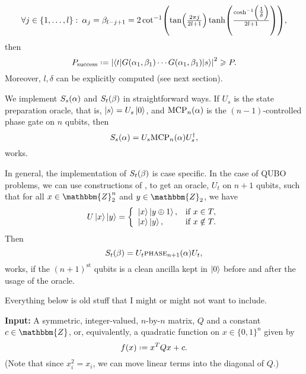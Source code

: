 \documentclass[reqno,oneside,12pt]{amsart}  %
\numberwithin{equation}{section}                %
\let\originalleft\left
\let\originalright\right
\renewcommand{\left}{\mathopen{}\mathclose\bgroup\originalleft}
\renewcommand{\right}{\aftergroup\egroup\originalright}
\def\({\mathopen{}\left(}
\def\){\right)\mathclose{}}
\newcommand*{\eqdef}{\mathrel{\vcenter{\baselineskip0.5ex \lineskiplimit0pt\hbox{.}\hbox{.}}}=}
\def\Z{\mathbbm{Z}}
\begin{document}
\begin{equation}
   \forall j \in \{ 1, \ldots, l \}: \: \alpha_j = \beta_{l - j + 1} = 2 \cot^{- 1} \( \tan \( \tfrac{2 \pi j}{2 l + 1} \) \tanh \( \tfrac{\cosh^{- 1} \( \tfrac{1}{\delta} \)}{2 l + 1} \) \),
\end{equation}
then
\begin{equation}
   P_{\mathrm{success}} \eqdef \left| \left\langle t \middle| G \( \alpha_1, \beta_1 \) \cdots G \( \alpha_1, \beta_1 \) \middle| s \right\rangle \right|^2 \geqslant P.
\end{equation}
Moreover, $l, \delta$ can be explicitly computed (see next section).

We implement $S_s \( \alpha \)$ and $S_t \( \beta \)$ in straightforward ways. If $U_s$ is the state preparation oracle, that is, $\ket{s} = U_s \ket{0}$, and $\mathrm{MCP}_n \( \alpha \)$ is the $(n - 1)$-controlled phase gate on $n$ qubits, then
\begin{equation}
   S_s \( \alpha \) = U_s \mathrm{MCP}_n \( \alpha \) U_s^\dagger,
\end{equation}
works.

In general, the implementation of $S_t \( \beta \)$ is case specific. In the case of QUBO problems, we can use constructions of , to get an oracle, $U_t$ on $n + 1$ qubits, such that for all $x \in \Z_2^n$ and $y \in \Z_2$, we have
\begin{equation}
   U \ket{x} \ket{y} = \left\{ \begin{array}{ll} \ket{x} \ket{y \oplus 1}, & \mbox{if } x \in T, \\ \ket{x} \ket{y}, & \mbox{if } x \notin T. \end{array} \right.
\end{equation}
Then
\begin{equation}
   S_t \( \beta \) = U_t \textsc{phase}_{n + 1} \( \alpha \) U_t,
\end{equation}
works, if the $(n + 1)^{\mathrm{st}}$ qubits is a clean ancilla kept in $\ket{0}$ before and after the usage of the oracle.

\newpage

{\color{red} Everything below is old stuff that I might or might not want to include.}

\noindent\textbf{Input:} A symmetric, integer-valued, $n$-by-$n$ matrix, $Q$ and a constant $c \in \Z$, or, equivalently, a quadratic function on $x \in \{ 0, 1 \}^n$ given by
\begin{equation}
   f (x) \eqdef x^T Q x + c. \label{eq:QUBO}
\end{equation}
(Note that since $x_i^2 = x_i$, we can move linear terms into the diagonal of $Q$.)
\end{document}
